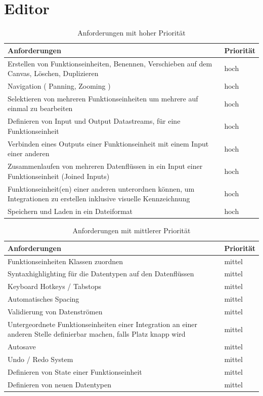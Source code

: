 \section{Editor}

\begin{table}[H]
\begin{tabularx}{\textwidth}{X|l}
Anforderungen & Priorität\\
\hline \hline
Erstellen von Funktionseinheiten, Benennen, Verschieben auf dem Canvas, Löschen, Duplizieren & hoch\\ \hline
Navigation ( Panning, Zooming ) & hoch\\ \hline
Selektieren von mehreren Funktionseinheiten um mehrere auf einmal zu bearbeiten & hoch\\ \hline
Definieren von Input und Output Datastreams, für eine Funktionseinheit & hoch\\ \hline
Verbinden eines Outputs einer Funktionseinheit mit einem Input einer anderen & hoch\\ \hline
Zusammenlaufen von mehreren Datenflüssen in ein Input einer Funktionseinheit (Joined Inputs) & hoch\\ \hline
Funktionseinheit(en) einer anderen unterordnen können, um Integrationen zu erstellen inklusive visuelle Kennzeichnung & hoch\\ \hline
Speichern und Laden in ein Dateiformat & hoch\\ \hline
\end{tabularx}
\caption{Anforderungen mit hoher Priorität}
\end{table}

\begin{table}[H]
\begin{tabularx}{\textwidth}{X|l}
	Anforderungen & Priorität\\
	\hline \hline
Funktionseinheiten Klassen zuordnen & mittel\\ \hline
Syntaxhighlighting für die Datentypen auf den Datenflüssen & mittel\\ \hline
Keyboard Hotkeys / Tabstops & mittel\\ \hline
Automatisches Spacing & mittel\\ \hline
Validierung von Datenströmen & mittel\\ \hline
Untergeordnete Funktionseinheiten einer Integration an einer anderen Stelle definierbar machen, falls Platz knapp wird & mittel\\ \hline
Autosave & mittel\\ \hline
Undo / Redo System & mittel\\ \hline
Definieren von State einer Funktionseinheit & mittel\\ \hline
Definieren von neuen Datentypen & mittel\\ \hline
\end{tabularx}
\caption{Anforderungen mit mittlerer Priorität}
\end{table}


